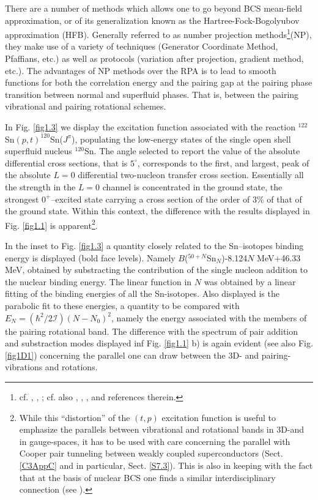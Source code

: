   
  There are a number of methods which allows one to go beyond BCS mean-field approximation, or of its generalization known as the Hartree-Fock-Bogolyubov approximation (HFB). Generally referred to as number projection methods\footnote{cf. \cite{Ring:80}, \cite{Egido:13}, \cite{Robledo:13}; cf. also \cite{Frauendorf:13}, \cite{Ring:13}, \cite{Heenen:13}, and references therein.}(NP), they make use of a variety of techniques (Generator Coordinate Method, Pfaffians, etc.) as well as protocols (variation after projection, gradient method, etc.). The advantages of NP methods over the RPA is to lead to smooth functions for both the correlation energy and the pairing gap at the pairing phase transition between normal and superfluid phases. That is, between the pairing vibrational and pairing rotational schemes.
  
  In Fig. \ref{fig1.3} we display the excitation function associated with the reaction $^{122}$Sn$(p,t)^{120}$Sn($J^\pi$), populating the low-energy states of the single open shell  superfluid nucleus $^{120}$Sn. The angle selected to report the value of the absolute differential cross sections, that is $5^\circ$, corresponds to the first, and largest, peak of the absolute $L=0$ differential two-nucleon transfer cross section. Essentially all the strength in the $L=0$ channel is concentrated in the ground state, the strongest $0^+$--excited state carrying a cross section of the order of 3\% of that of the ground state. Within this context, the difference with the results displayed in Fig. \ref{fig1.1} is apparent\footnote{\label{f19} While this ``distortion'' of the $(t,p)$ excitation function is useful to emphasize the parallels between vibrational and rotational bands in 3D-and in gauge-spaces, it has to be used with care concerning the parallel with Cooper pair tunneling between weakly coupled superconductors (Sect. \ref{C3AppC} and in particular, Sect. \ref{S7.3}). This is also in keeping with the fact that at the basis of nuclear BCS one finds a similar interdisciplinary connection (see \cite{Bohr:58}).}.
  
  In the inset to Fig. \ref{fig1.3} a quantity closely related to the Sn--isotopes binding energy is displayed (bold face levels). Namely $B$($^{50+N}$Sn$_N$)-8.124$N$ MeV+46.33 MeV, obtained by substracting the contribution of the single nucleon addition to the nuclear binding energy. The linear function in $N$ was obtained by a linear fitting of the binding energies of all the Sn-isotopes. 
  Also displayed is the parabolic fit to these energies, a quantity to be compared with $E_N=(\hbar^2/2\mathcal I)(N-N_0)^2$, namely the energy associated with the members of the pairing rotational band. The difference with the spectrum of pair addition and substraction modes displayed inf Fig. \ref{fig1.1} b) is again evident (see also Fig. \ref{fig1D1}) concerning the parallel one can draw between the 3D- and pairing-vibrations and rotations.
  

